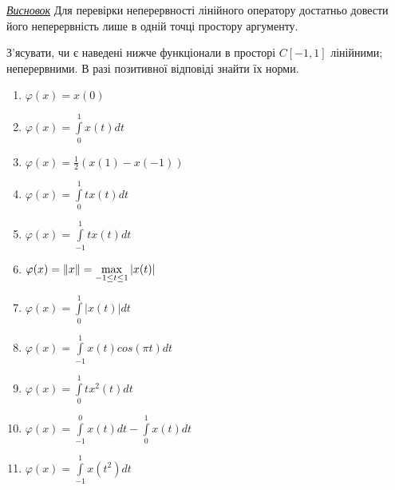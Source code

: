\begin{theory}
    \underline{\emph{Висновок}} Для перевірки неперервності лінійного оператору достатньо 
    довести його неперервність лише в одній точці простору аргументу.
\end{theory}

\begin{exercise}
    З'ясувати, чи є наведені нижче функціонали в просторі $C{\left[-1, 1\right]}$ лінійними; 
    неперервними. В разі позитивної відповіді знайти їх норми. 
    \begin{enumerate}[label=\ukr*)]
        \item $\varphi(x) = x(0)$
        \item $\varphi(x) = \int\limits_0^1x(t)dt$
        \item $\varphi(x) = \frac{1}{2}(x(1) - x(-1))$
        \item $\varphi(x) = \int\limits_0^1tx(t)dt$
        \item $\varphi(x) = \int\limits_{-1}^1tx(t)dt$
        \item $\varphi(x) = \left\lVert x\right\rVert = \max\limits_{-1 \leq t \leq 1} |x(t)|$
        \item $\varphi(x) = \int\limits_0^1|x(t)|dt$
        \item $\varphi(x) = \int\limits_{-1}^1x(t)cos(\pi t)dt$
        \item $\varphi(x) = \int\limits_0^1tx^2(t)dt$
        \item $\varphi(x) = \int\limits_{-1}^0x(t)dt - \int\limits_0^1x(t)dt$
        \item $\varphi(x) = \int\limits_{-1}^1x(t^2)dt$
    \end{enumerate}
\end{exercise}

